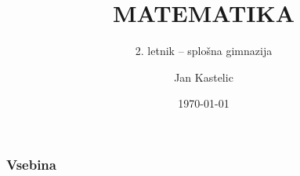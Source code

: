 \documentclass[1pt, aspectratio=169,t]{beamer}
\title{MATEMATIKA}
\subtitle{2. letnik -- splošna gimnazija}
\date{\today}
\author{Jan Kastelic}
\institute[GAA]{Gimnazija Antona Aškerca, \\ Šolski center Ljubljana}
\begin{document}
\begin{frame}
	\titlepage
\end{frame}
	

\begin{frame}
	\frametitle{Vsebina}
	\tableofcontents[hideallsubsections]
\end{frame}
	

% 
% 
% 
% 
% 
% 
% 
% 
% 
% 
\end{document}
